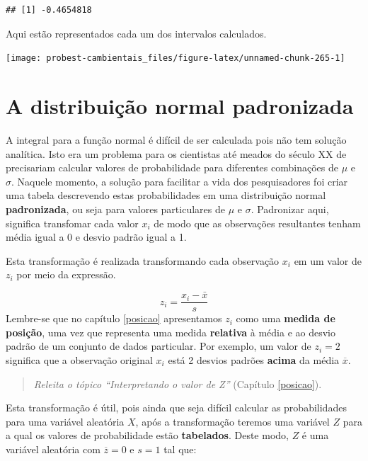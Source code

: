 \documentclass[
]{book}
\begin{document}
\begin{verbatim}
## [1] -0.4654818
\end{verbatim}

Aqui estão representados cada um dos intervalos calculados.

\begin{center}\texttt{[image: probest-cambientais\_files/figure-latex/unnamed-chunk-265-1]} \end{center}

\hypertarget{a-distribuiuxe7uxe3o-normal-padronizada}{%
\section{A distribuição normal padronizada}\label{a-distribuiuxe7uxe3o-normal-padronizada}}

A integral para a função normal é difícil de ser calculada pois não tem solução analítica. Isto era um problema para os cientistas até meados do século XX de precisariam calcular valores de probabilidade para diferentes combinações de \(\mu\) e \(\sigma\). Naquele momento, a solução para facilitar a vida dos pesquisadores foi criar uma tabela descrevendo estas probabilidades em uma distribuição normal \textbf{padronizada}, ou seja para valores particulares de \(\mu\) e \(\sigma\). Padronizar aqui, significa transfomar cada valor \(x_i\) de modo que as observações resultantes tenham média igual a 0 e desvio padrão igual a 1.

Esta transformação é realizada transformando cada observação \(x_i\) em um valor de \(z_i\) por meio da expressão.

\[z_i = \frac{x_i - \bar{x}}{s}\]
Lembre-se que no capítulo \ref{posicao} apresentamos \(z_i\) como uma \textbf{medida de posição}, uma vez que representa uma medida \textbf{relativa} à média e ao desvio padrão de um conjunto de dados particular. Por exemplo, um valor de \(z_i = 2\) significa que a observação original \(x_i\) está 2 desvios padrões \textbf{acima} da média \(\overline{x}\).

\begin{quote}
\emph{Releita o tópico ``Interpretando o valor de Z''} (Capítulo \ref{posicao}).
\end{quote}

Esta transformação é útil, pois ainda que seja difícil calcular as probabilidades para uma variável aleatória \(X\), após a transformação teremos uma variável \(Z\) para a qual os valores de probabilidade estão \textbf{tabelados}. Deste modo, \(Z\) é uma variável aleatória com \(\overline{z} = 0\) e \(s = 1\) tal que:
\end{document}

